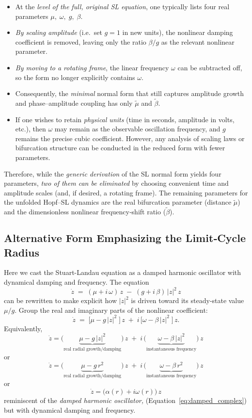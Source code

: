 \begin{itemize}
  \item At the \emph{level of the full, original SL equation}, one typically lists four real parameters \(\mu,\;\omega,\;g,\;\beta\).  
  \item \emph{By scaling amplitude} (i.e.\ set \(g=1\) in new units), the nonlinear damping coefficient is removed, leaving only the ratio \(\beta/g\) as the relevant nonlinear parameter.  
  \item \emph{By moving to a rotating frame}, the linear frequency \(\omega\) can be subtracted off, so the form no longer explicitly contains \(\omega\).  
  \item Consequently, the \emph{minimal} normal form that still captures amplitude growth and phase–amplitude coupling has only \(\tilde\mu\) and \(\tilde\beta\).  

  \item If one wishes to retain \emph{physical units} (time in seconds, amplitude in volts, etc.), then \(\omega\) may remain as the observable oscillation frequency, and \(g\) remains the precise cubic coefficient.  However, any analysis of scaling laws or bifurcation structure can be conducted in the reduced form with fewer parameters.
\end{itemize}

Therefore, while the \emph{generic derivation} of the SL normal form yields four parameters, \emph{two of them can be eliminated} by choosing convenient time and amplitude scales (and, if desired, a rotating frame).  The remaining parameters for the unfolded Hopf–SL dynamics are the real bifurcation parameter (distance \(\tilde\mu\)) and the dimensionless nonlinear frequency‐shift ratio (\(\tilde\beta\)).   

\subsection{Alternative Form Emphasizing  the Limit‐Cycle Radius}

Here we cast the Stuart-Landau equation as a damped harmonic oscillator with dynamical damping and frequency.
The  equation
\[
\dot z \;=\; (\mu + i\,\omega)\,z \;-\; (g + i\,\beta)\,\lvert z\rvert^2\,z
\]
can be rewritten to make explicit how \(\lvert z\rvert^2\) is driven toward its steady‐state value \(\mu/g\).  Group the real and imaginary parts of the nonlinear coefficient:
\[
\dot z 
\;=\; \bigl[\mu - g\,\lvert z\rvert^2 \;\bigr]\,z 
\;+\; i\,\bigl[\omega - \beta\,\lvert z\rvert^2 \;\bigr]\,z.
\]
Equivalently,
\[
\boxed{
\dot z 
= \bigl(\underbrace{\mu - g\,\lvert z\rvert^2}_{\text{real radial growth/damping}}\bigr)\,z 
\;+\; i\,\bigl(\underbrace{\omega - \beta\,\lvert z\rvert^2}_{\text{instantaneous frequency}}\bigr)\,z
}
\]
or
\[
\boxed{
\dot z 
= \bigl(\underbrace{\mu - g\,r^2}_{\text{real radial growth/damping}}\bigr)\,z 
\;+\; i\,\bigl(\underbrace{\omega - \beta\,r^2}_{\text{instantaneous frequency}}\bigr)\,z
}
\]
or
$$
\boxed{
\dot z = \big( \alpha(r)  + i \omega(r) \big)\, z}
$$
reminiscent of the \textit{damped harmonic oscillator,} (Equation~\ref{eq:damped_complex}) but with dynamical damping and frequency.

